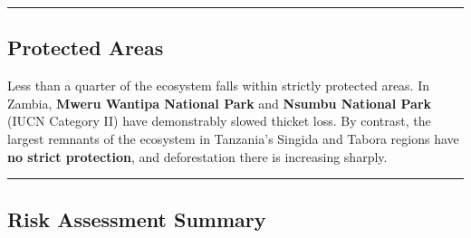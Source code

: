 \documentclass[
  11pt,
  a4paper,
  DIV=11,
  numbers=noendperiod]{scrartcl}
\begin{document}
\begin{center}\rule{0.5\linewidth}{0.5pt}\end{center}

\subsection{Protected Areas}\label{protected-areas}

Less than a quarter of the ecosystem falls within strictly protected
areas. In Zambia, \textbf{Mweru Wantipa National Park} and
\textbf{Nsumbu National Park} (IUCN Category II) have demonstrably
slowed thicket loss. By contrast, the largest remnants of the ecosystem
in Tanzania's Singida and Tabora regions have \textbf{no strict
protection}, and deforestation there is increasing sharply.

\begin{center}\rule{0.5\linewidth}{0.5pt}\end{center}

\subsection{Risk Assessment Summary}\label{risk-assessment-summary}
\end{document}
